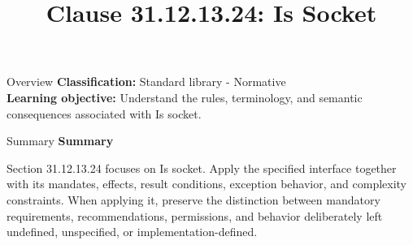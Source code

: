 \documentclass[10pt,letterpaper]{article}
\title{Clause 31.12.13.24: Is Socket}
\author{}
\date{}
\begin{document}
\maketitle
\begin{CornellOverviewBox}{Overview}
\textbf{Classification:} Standard library - Normative\\[2pt]
\textbf{Learning objective:} Understand the rules, terminology, and semantic consequences associated with Is socket.
\end{CornellOverviewBox}\begin{CornellSummaryBox}{Summary}
{\sffamily\bfseries\color{Accent} Summary}\par\vspace{3pt}Section 31.12.13.24 focuses on Is socket. Apply the specified interface together with its mandates, effects, result conditions, exception behavior, and complexity constraints. When applying it, preserve the distinction between mandatory requirements, recommendations, permissions, and behavior deliberately left undefined, unspecified, or implementation-defined.
\end{CornellSummaryBox}
\end{document}
